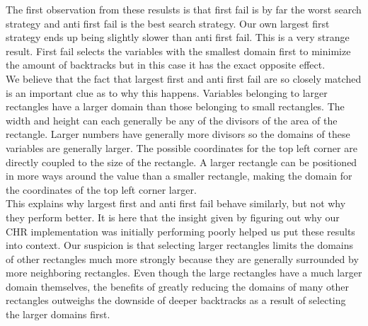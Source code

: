 The first observation from these resulsts is that first fail is by far the worst search strategy and anti first fail is the best search strategy. Our own largest first strategy ends up being slightly slower than anti first fail. This is a very strange result. First fail selects the variables with the smallest domain first to minimize the amount of backtracks but in this case it has the exact opposite effect. 
\\
We believe that the fact that largest first and anti first fail are so closely matched is an important clue as to why this happens. Variables belonging to larger rectangles have a larger domain than those belonging to small rectangles. The width and height can each generally be any of the divisors of the area of the rectangle. Larger numbers have generally more divisors so the domains of these variables are generally larger. The possible coordinates for the top left corner are directly coupled to the size of the rectangle. A larger rectangle can be positioned in more ways around the value than a smaller rectangle, making the domain for the coordinates of the top left corner larger.
\\
This explains why largest first and anti first fail behave similarly, but not why they perform better. It is here that the insight given by figuring out why our CHR implementation was initially performing poorly helped us put these results into context. Our suspicion is that selecting larger rectangles limits the domains of other rectangles much more strongly because they are generally surrounded by more neighboring rectangles. Even though the large rectangles have a much larger domain themselves, the benefits of greatly reducing the domains of many other rectangles outweighs the downside of deeper backtracks as a result of selecting the larger domains first.

